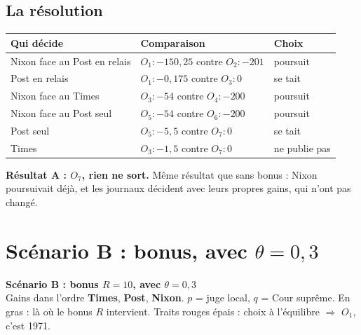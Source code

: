 \documentclass[11pt,a4paper]{article}
\theoremstyle{definition}
\newcommand{\T}[1]{\textcolor{nyt}{#1}}
\newcommand{\W}[1]{\textcolor{wp}{#1}}
\newcommand{\N}[1]{\textcolor{gov}{#1}}
\begin{document}
\subsection{La résolution}
\begin{center}
\small
\begin{tabular}{@{}lll@{}}
\toprule
Qui décide & Comparaison & Choix \\
\midrule
\N{Nixon} face au Post en relais & $O_1:-150,25$ contre $O_2:-201$ & poursuit \\
\W{Post} en relais & $O_1:-0,175$ contre $O_3:0$ & se tait \\
\N{Nixon} face au Times & $O_3:-54$ contre $O_4:-200$ & poursuit \\
\N{Nixon} face au Post seul & $O_5:-54$ contre $O_6:-200$ & poursuit \\
\W{Post} seul & $O_5:-5,5$ contre $O_7:0$ & se tait \\
\T{Times} & $O_3:-1,5$ contre $O_7:0$ & ne publie pas \\
\bottomrule
\end{tabular}
\end{center}
\begin{resultat}
\textbf{Résultat A : $O_7$, rien ne sort.} Même résultat que sans bonus : Nixon poursuivait déjà, et les journaux décident avec leurs propres gains, qui n'ont pas changé.
\end{resultat}

\section{Scénario B : bonus, avec \texorpdfstring{$\theta=0,3$}{theta = 0,3}}

\begin{landscape}
\begin{center}{\large\bfseries Scénario B : bonus $R=10$, avec $\theta=0,3$}\\[2pt]{\small Gains dans l'ordre \textcolor{nyt}{\textbf{Times}}, \textcolor{wp}{\textbf{Post}}, \textcolor{gov}{\textbf{Nixon}}. $p$ = juge local, $q$ = Cour suprême. En gras : là où le bonus $R$ intervient. Traits rouges épais : choix à l'équilibre $\Rightarrow$ $O_1$, c'est 1971.}\end{center}\vspace{-4pt}
\noindent\resizebox{\linewidth}{!}{}
\end{landscape}
\end{document}
